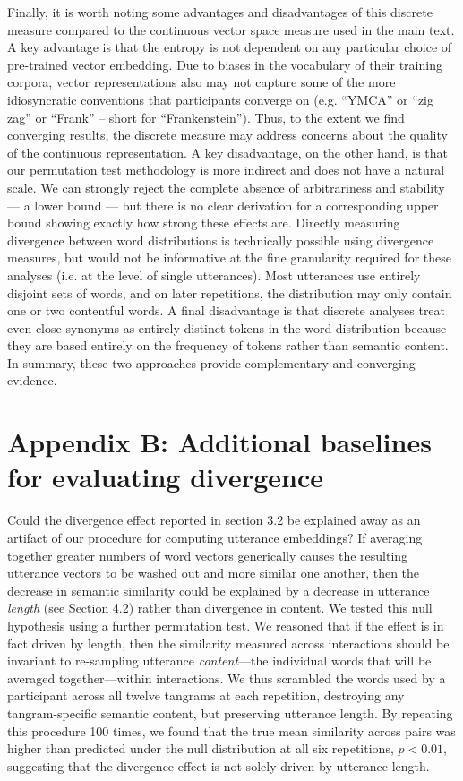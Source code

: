 \documentclass[alpha-refs]{wiley-article}
\begin{document}
Finally, it is worth noting some advantages and disadvantages of this discrete measure compared to the continuous vector space measure used in the main text.
A key advantage is that the entropy is not dependent on any particular choice of pre-trained vector embedding.
Due to biases in the vocabulary of their training corpora, vector representations also may not capture some of the more idiosyncratic conventions that participants converge on (e.g. ``YMCA'' or ``zig zag'' or ``Frank'' -- short for ``Frankenstein'').
Thus, to the extent we find converging results, the discrete measure may address concerns about the quality of the continuous representation.
A key disadvantage, on the other hand, is that our permutation test methodology is more indirect and does not have a natural scale. 
We can strongly reject the complete absence of arbitrariness and stability --- a lower bound --- but there is no clear derivation for a corresponding upper bound showing exactly how strong these effects are.
Directly measuring divergence between word distributions is technically possible using divergence measures, but would not be informative at the fine granularity required for these analyses (i.e. at the level of single utterances).
Most utterances use entirely disjoint sets of words, and on later repetitions, the distribution may only contain one or two contentful words. 
A final disadvantage is that discrete analyses treat even close synonyms as entirely distinct tokens in the word distribution because they are based entirely on the frequency of tokens rather than semantic content.
In summary, these two approaches provide complementary and converging evidence.

\section*{Appendix B: Additional baselines for evaluating divergence}

Could the divergence effect reported in section 3.2 be explained away as an artifact of our procedure for computing utterance embeddings?
If averaging together greater numbers of word vectors generically causes the resulting utterance vectors to be washed out and more similar one another, then the decrease in semantic similarity could be explained by a decrease in utterance \emph{length} (see Section 4.2) rather than divergence in content.
We tested this null hypothesis using a further  permutation test. 
We reasoned that if the effect is in fact driven by length, then the similarity measured across interactions should be invariant to re-sampling utterance \emph{content}---the individual words that will be averaged together---within interactions.
We thus scrambled the words used by a participant across all twelve tangrams at each repetition, destroying any tangram-specific semantic content, but preserving utterance length.
By repeating this procedure 100 times, we found that the true mean similarity across pairs was higher than predicted under the null distribution at all six repetitions, $p < 0.01$, suggesting that the divergence effect is not solely driven by utterance length.
\end{document}
